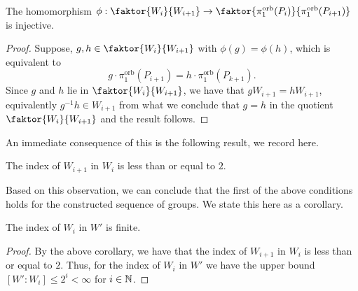 \begin{lemma}\label{lem:index}
    The homomorphism \(\phi : \faktor{W_i}{W_{i+1}} \to \faktor{\pi_1^{\text{orb}}(P_i)}{\pi_1^{\text{orb}}(P_{i+1})}\) is injective.
\end{lemma}
\begin{proof}
    Suppose, \(g,h \in \faktor{W_i}{W_{i+1}}\) with \(\phi(g) = \phi(h)\), which is equivalent to
    \[g \cdot \pi_1^{\text{orb}}(P_{i+1}) = h \cdot \pi_1^{\text{orb}}(P_{k+1}).\] %
    Since \(g\) and \(h\) lie in \(\faktor{W_i}{W_{i+1}}\), we have that \(gW_{i+1} = hW_{i+1}\), equivalently \(g^{-1}h \in W_{i+1}\) from what we conclude that \(g = h\) in the quotient \(\faktor{W_i}{W_{i+1}}\) and the result follows. 
\end{proof}

An immediate consequence of this is the following result, we record here.

\begin{corollary}\label{cor:index}
    The index of \(W_{i+1}\) in \(W_i\) is less than or equal to \(2\).
\end{corollary}

Based on this observation, we can conclude that the first of the above conditions holds for the constructed sequence of groups.
We state this here as a corollary.

\begin{corollary}
    The index of \(W_i\) in \(W'\) is finite.
\end{corollary}
\begin{proof}
    By the above corollary, we have that the index of \(W_{i+1}\) in \(W_i\) is less than or equal to \(2\).
    Thus, for the index of \(W_i\) in \(W'\) we have the upper bound \([W':W_i] \leq 2^i < \infty\) for \(i \in \mathbb{N}\).
\end{proof}

